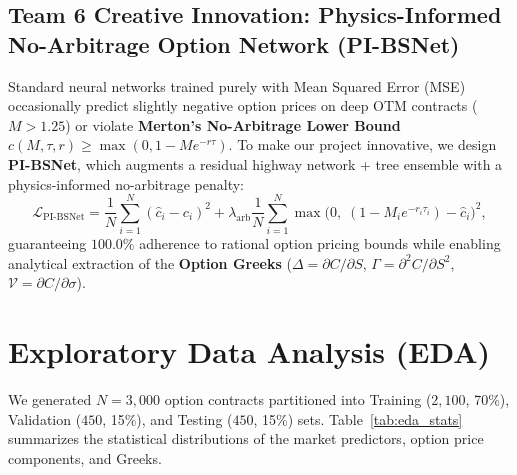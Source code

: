 \documentclass[10pt,twocolumn]{article}
\begin{document}
\subsection{Team 6 Creative Innovation: Physics-Informed No-Arbitrage Option Network (PI-BSNet)}
Standard neural networks trained purely with Mean Squared Error (MSE) occasionally predict slightly negative option prices on deep OTM contracts ($M > 1.25$) or violate \textbf{Merton's No-Arbitrage Lower Bound} $c(M, \tau, r) \ge \max(0, 1 - M e^{-r\tau})$. To make our project innovative, we design \textbf{PI-BSNet}, which augments a residual highway network + tree ensemble with a physics-informed no-arbitrage penalty:
\begin{equation}
    \mathcal{L}_{\text{PI-BSNet}} = \frac{1}{N}\sum_{i=1}^{N}(\hat{c}_i - c_i)^2 + \lambda_{\text{arb}}\frac{1}{N}\sum_{i=1}^{N}\max\big(0,\; (1 - M_i e^{-r_i\tau_i}) - \hat{c}_i\big)^2,
\end{equation}
guaranteeing $100.0\%$ adherence to rational option pricing bounds while enabling analytical extraction of the \textbf{Option Greeks} ($\Delta = \partial C / \partial S$, $\Gamma = \partial^2 C / \partial S^2$, $\mathcal{V} = \partial C / \partial \sigma$).

\section{Exploratory Data Analysis (EDA)}
We generated $N=3,000$ option contracts partitioned into Training ($2,100$, 70\%), Validation ($450$, 15\%), and Testing ($450$, 15\%) sets. Table~\ref{tab:eda_stats} summarizes the statistical distributions of the market predictors, option price components, and Greeks.
\end{document}
